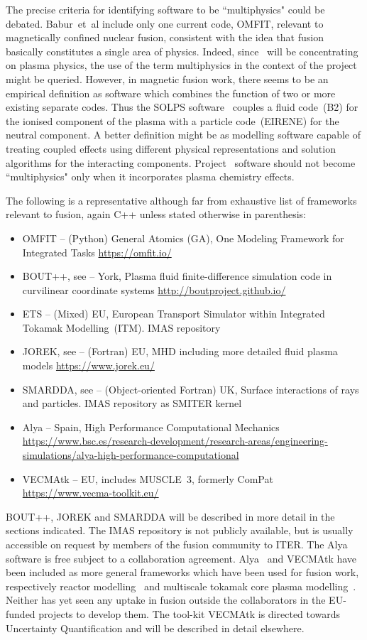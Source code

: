 The precise criteria for identifying software to be ``multiphysics" could be debated.
Babur~et~al include only one current code, OMFIT, relevant to magnetically confined
nuclear fusion, consistent with
the idea that fusion basically constitutes a single area of physics. Indeed,
since  \nep \ will be concentrating on plasma physics, the use of the term multiphysics 
in the context of the project might be queried. However, in magnetic fusion work, there
seems to be an empirical definition as software which combines the function of two or more
existing separate codes. Thus the SOLPS software~\cite{Bo16Pres} couples a fluid
code~(B2) for the ionised component of the plasma with a particle code~(EIRENE) for
the neutral component. A better definition might be as modelling software
capable of treating coupled effects using different physical representations 
and solution algorithms for the interacting components.
Project \nep \ software should not become ``multiphysics" only when 
it incorporates plasma chemistry effects.

The following is a representative although far from exhaustive list of
frameworks relevant to fusion, again C++ unless stated otherwise in parenthesis:
\begin{itemize}
\item OMFIT  -- (Python) General Atomics (GA), One Modeling Framework for Integrated Tasks \url{https://omfit.io/}
\item BOUT++, see   -- York, Plasma fluid finite-difference simulation code in curvilinear coordinate systems  \url{http://boutproject.github.io/ }
\item ETS  -- (Mixed) EU,  European Transport Simulator within Integrated Tokamak Modelling~(ITM).  IMAS repository %
\item JOREK, see  --  (Fortran) EU, MHD including more detailed fluid plasma models \url{https://www.jorek.eu/}
\item SMARDDA, see   -- (Object-oriented Fortran) UK, Surface interactions of rays and particles. IMAS repository as SMITER kernel
\item Alya  -- Spain, High Performance Computational Mechanics \url{https://www.bsc.es/research-development/research-areas/engineering-simulations/alya-high-performance-computational }
\item VECMAtk -- EU, includes MUSCLE~3, formerly ComPat \url{https://www.vecma-toolkit.eu/}
\end{itemize}
BOUT++, JOREK and SMARDDA will be described in more detail in the sections indicated.
The IMAS repository is not publicly available, but is usually accessible on request by  
members of the fusion community to ITER.
The Alya software is free subject to a collaboration agreement. Alya~\cite{Va16Alya} and VECMAtk
have been included as more general frameworks which have been used for fusion work,
respectively reactor modelling~\cite{Gu18Newh} and multiscale tokamak core plasma modelling~\cite{Lu19Comp}.
Neither has yet seen any uptake in fusion outside the collaborators in the EU-funded
projects to develop them. The tool-kit VECMAtk is directed towards Uncertainty Quantification
and will be described in detail elsewhere.

